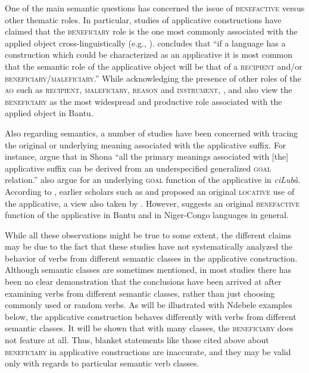 \documentclass[output=paper]{langsci/langscibook}
\begin{document}
One of the main semantic questions has concerned the issue of \textsc{benefactive} versus other thematic roles. In particular, studies of applicative constructions have claimed that the \textsc{beneficiary} role is the one most commonly associated with the applied object cross-linguistically (e.g., \citealt{Peterson2007,Polinsky2008,KiittilaZuniga2010}). \citet[40]{Peterson2007} concludes that “if a language has a construction which could be characterized as an applicative it is most common that the semantic role of the applicative object will be that of a \textsc{recipient} and/or \textsc{beneficiary}/\textsc{maleficiary.”} While acknowledging the presence of other roles of the \textsc{ao} such as \textsc{recipient}, \textsc{maleficiary}, \textsc{reason} and \textsc{instrument}, \citet{Schadeberg2003}, \citet[101]{deKindBostoen2012} and  \citet[1]{MartenKula2014} also view the \textsc{beneficiary} as the most widespread and productive role associated with the applied object in Bantu. 

Also regarding semantics, a number of studies have been concerned with tracing the original or underlying meaning associated with the applicative suffix. For instance, \citet[3]{CannMabhugu2007} argue that in Shona “all the primary meanings associated with [the] applicative suffix can be derived from an underspecified generalized \textsc{goal} relation.”   \citet{DeKindBostoen2012} also argue for an underlying \textsc{goal} function of the applicative in \textit{ciLubà}. According to \citet{Trithart1983}, earlier scholars such as \citet{Endemann1876,vanEeden1956} and  \citet{KahlerMayer1966} proposed an original \textsc{locative} use of the applicative, a view also taken by \citet[74]{Schadeberg2003}. However, \citet[75]{Trithart1983} suggests an original \textsc{benefactive} function of the applicative in Bantu and in Niger-Congo languages in general. 

While all these observations might be true to some extent, the different claims may be due to the fact that these studies have not systematically analyzed the behavior of verbs from different semantic classes in the applicative construction. Although semantic classes are sometimes mentioned, in most studies there has been no clear demonstration that the conclusions have been arrived at after examining verbs from different semantic classes, rather than just choosing commonly used or random verbs. As will be illustrated with Ndebele examples below, the applicative construction behaves differently with verbs from different semantic classes. It will be shown that with many classes, the \textsc{beneficiary} does not feature at all. Thus, blanket statements like those cited above about \textsc{beneficiary} in applicative constructions are inaccurate, and they may be valid only with regards to particular semantic verb classes.
\end{document}
